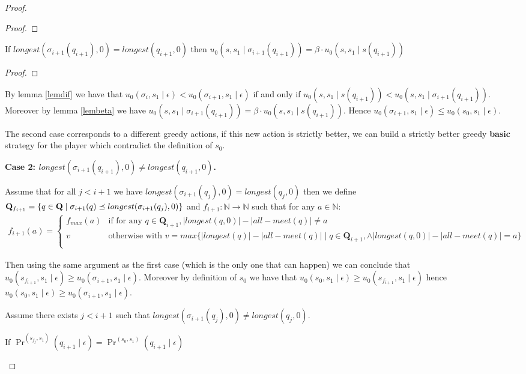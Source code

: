 \documentclass[11pt]{article}
\begin{document}
\begin{proof}
\begin{proof}
\fi
\end{proof}

\begin{mylem}
\label{lembeta}
If $longest(\sigma_{i+1}(q_{i+1}),0) = longest(q_{i+1},0)$ then  $u_0(s,s_1 \mid \sigma_{i+1}(q_{i+1})) = \beta \cdot u_0(s,s_1 \mid s(q_{i+1}))$
\end{mylem}
\begin{proof}
\end{proof}

By lemma \ref{lemdif} we have that $u_0(\sigma_i,s_1 \mid \epsilon) < u_0(\sigma_{i+1},s_1 \mid \epsilon)$ if and only if $u_0(s,s_1 \mid s(q_{i+1})) < u_0(s,s_1 \mid \sigma_{i+1}(q_{i+1}))$.
Moreover by lemma \ref{lembeta} we have $u_0(s,s_1 \mid \sigma_{i+1}(q_{i+1})) = \beta \cdot u_0(s,s_1 \mid s(q_{i+1}))$.
Hence $u_0(\sigma_{i+1},s_1 \mid \epsilon) \leq u_0(s_0,s_1 \mid \epsilon)$.

\bigskip
The second case corresponds to a different greedy actions, if this new action is strictly better, we can build a strictly better greedy \textbf{basic} strategy for the player which contradict the definition of $s_0$.

\textbf{Case 2: $longest(\sigma_{i+1}(q_{i+1}),0) \neq longest(q_{i+1},0)$.}

Assume that for all $j < i+1$ we have $longest(\sigma_{i+1}(q_{j}),0) = longest(q_{j},0)$ then we define $\mathbf{Q}_{f_{i+1}} = \{q \in \mathbf{Q} \mid \sigma_{i+1}(q) \preceq longest(\sigma_{i+1}(q_{j}),0) \}$ and  $f_{i+1} : \mathbb{N} \rightarrow \mathbb{N}$ such that for any $a \in \mathbb{N}$:
\begin{eqnarray*}
f_{i+1}(a) =
\begin{cases}
f_{max}(a) & \text{if for any } q \in \mathbf{Q}_{i+1}, |longest(q,0)| - |all-meet(q)| \neq a\\
v & \text{otherwise with } v = max \{|longest(q)| - |all-meet(q)| \mid q \in \mathbf{Q}_{i+1}, \land |longest(q,0)| - |all-meet(q)| = a \}\\
\end{cases}
\end{eqnarray*}

Then using the same argument as the first case (which is the only one that can happen) we can conclude that  $u_0(s_{f_{i+1}},s_1 \mid \epsilon) \geq u_0(\sigma_{i+1},s_1 \mid \epsilon)$. Moreover by definition of $s_0$ we have that
$u_0(s_0,s_1 \mid \epsilon) \geq u_0(s_{f_{i+1}},s_1 \mid \epsilon)$ hence $u_0(s_0,s_1 \mid \epsilon) \geq u_0(\sigma_{i+1},s_1 \mid \epsilon)$.

\bigskip
Assume there exists $j < i+1$ such that $longest(\sigma_{i+1}(q_{j}),0) \neq longest(q_{j},0)$.

\begin{mylem}
If $\Pr^{(s_{f_j},s_1)}(q_{i+1} \mid \epsilon) = \Pr^{(s_{0},s_1)}(q_{i+1} \mid \epsilon)$
\end{mylem}



\end{proof}
\end{document}
